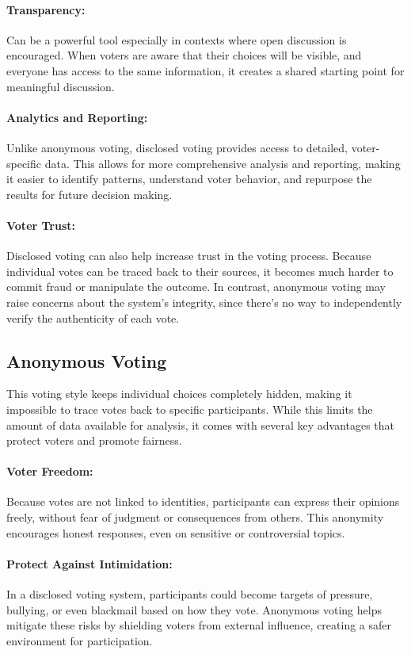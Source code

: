 \documentclass[a4paper,12pt]{report}
\begin{document}
\paragraph{Transparency:}
Can be a powerful tool especially in contexts where open discussion is encouraged. When voters are aware that their choices will be visible, and everyone has access to the same information, it creates a shared starting point for meaningful discussion.
\paragraph{Analytics and Reporting:}
Unlike anonymous voting, disclosed voting provides access to detailed, voter-specific data. This allows for more comprehensive analysis and reporting, making it easier to identify patterns, understand voter behavior, and repurpose the results for future decision making.
\paragraph{Voter Trust:}
Disclosed voting can also help increase trust in the voting process. Because individual votes can be traced back to their sources, it becomes much harder to commit fraud or manipulate the outcome. In contrast, anonymous voting may raise concerns about the system’s integrity, since there’s no way to independently verify the authenticity of each vote. \parencite{disvsanon} \\
\subsection{Anonymous Voting}
This voting style keeps individual choices completely hidden, making it impossible to trace votes back to specific participants. While this limits the amount of data available for analysis, it comes with several key advantages that protect voters and promote fairness.
\paragraph{Voter Freedom:}
Because votes are not linked to identities, participants can express their opinions freely, without fear of judgment or consequences from others. This anonymity encourages honest responses, even on sensitive or controversial topics.
\paragraph{Protect Against Intimidation:}
In a disclosed voting system, participants could become targets of pressure, bullying, or even blackmail based on how they vote. Anonymous voting helps mitigate these risks by shielding voters from external influence, creating a safer environment for participation.
\end{document}

